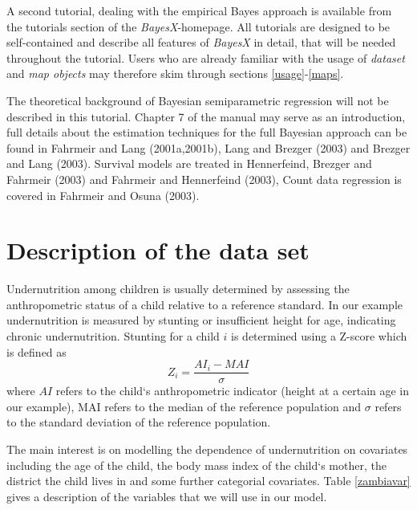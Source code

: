 \documentclass{article}
\begin{document}
A second tutorial, dealing with the empirical Bayes approach is
available from the tutorials section of the {\it BayesX}-homepage.
All tutorials are designed to be self-contained and describe all
features of {\it BayesX} in detail, that will be needed throughout
the tutorial. Users who are already familiar with the usage of
{\it dataset} and {\it map objects} may therefore skim through
sections \ref{usage}-\ref{maps}.

The theoretical background of Bayesian semiparametric regression
will not be described in this tutorial. Chapter 7 of the manual
may serve as an introduction, full details about the estimation
techniques for the full Bayesian approach can be found in Fahrmeir
and Lang (2001a,2001b),\nocite{fahlan01a}\nocite{fahlan01b} Lang
and Brezger (2003) and Brezger and Lang
(2003).\nocite{lanbre03}\nocite{lanbre03} Survival models are
treated in Hennerfeind, Brezger and Fahrmeir
(2003)\nocite{henfah03} and Fahrmeir and Hennerfeind
(2003)\nocite{fahhen03}, Count data regression is covered in
Fahrmeir and Osuna (2003)\nocite{fahosu03}.

\section{Description of the data set}

Undernutrition among children is usually determined by assessing
the anthropometric status of a child relative to a reference
standard. In our example undernutrition is measured by stunting or
insufficient height for age, indicating chronic undernutrition.
Stunting for a child $i$ is determined using a Z-score which is
defined as
\[Z_i = \frac{AI_i-MAI}{\sigma}\]
where $AI$ refers to the child`s anthropometric indicator (height
at a certain age in our example), MAI refers to the median of the
reference population and $\sigma$ refers to the standard deviation
of the reference population.

The main interest is on modelling the dependence of undernutrition
on covariates including the age of the child, the body mass index
of the child`s mother, the district the child lives in and some
further categorial covariates. Table \ref{zambiavar} gives a
description of the variables that we will use in our model.
\end{document}
